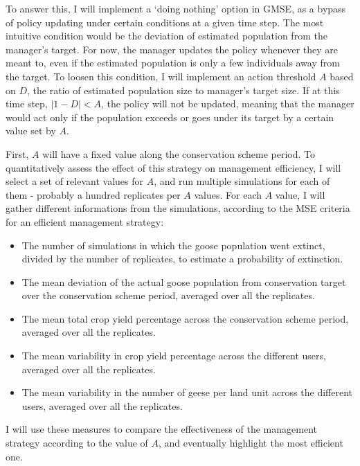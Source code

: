 \documentclass[12pt,a4paper]{article}
\begin{document}
To answer this, I will implement a `doing nothing' option in GMSE, as a bypass of policy updating under certain conditions at a given time step. %
The most intuitive condition would be the deviation of estimated population from the manager's target.
For now, the manager updates the policy whenever they are meant to, even if the estimated population is only a few individuals away from the target.
To loosen this condition, I will implement an action threshold $A$ based on $D$, the ratio of estimated population size to manager's target size.
If at this time step, $|1 - D| < A$, the policy will not be updated, meaning that the manager would act only if the population exceeds or goes under its target by a certain value set by $A$. %

First, $A$ will have a fixed value along the conservation scheme period.
To quantitatively assess the effect of this strategy on management efficiency, I will select a set of relevant values for $A$, and run multiple simulations for each of them - probably a hundred replicates per $A$ values.
For each $A$ value, I will gather different informations from the simulations, according to the MSE criteria for an efficient management strategy:
\begin{itemize}
	\item The number of simulations in which the goose population went extinct, divided by the number of replicates, to estimate a probability of extinction.
	\item The mean deviation of the actual goose population from conservation target over the conservation scheme period, averaged over all the replicates.
	\item The mean total crop yield percentage across the conservation scheme period, averaged over all the replicates.
	\item The mean variability in crop yield percentage across the different users, averaged over all the replicates.
	\item The mean variability in the number of geese per land unit across the different users, averaged over all the replicates.
\end{itemize}
I will use these measures to compare the effectiveness of the management strategy according to the value of $A$, and eventually highlight the most efficient one.\\ %
\end{document}
